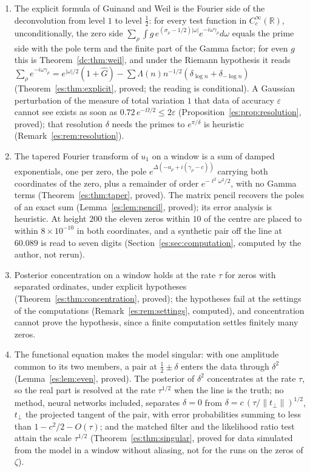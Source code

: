 \begin{enumerate}
\item The explicit formula of Guinand and Weil is the Fourier side of the deconvolution from level $1$ to level $\tfrac12$: for every test function in $C_c^\infty(\mathbb R)$, unconditionally, the zero side $\sum_\rho\int g\,e^{(\sigma_\rho-1/2)|\omega|}e^{-i\omega\gamma_\rho}d\omega$ equals the prime side with the pole term and the finite part of the Gamma factor; for even $g$ this is Theorem~\ref{dc:thm:weil}, and under the Riemann hypothesis it reads $\sum_\rho e^{-i\omega\gamma_\rho}=e^{|\omega|/2}(1+\widehat G)-\sum\Lambda(n)n^{-1/2}(\delta_{\log n}+\delta_{-\log n})$ (Theorem~\ref{es:thm:explicit}, proved; the reading is conditional). A Gaussian perturbation of the measure of total variation $1$ that data of accuracy $\varepsilon$ cannot see exists as soon as $0.72\,e^{-\Omega/2}\le2\varepsilon$ (Proposition~\ref{es:prop:resolution}, proved); that resolution $\delta$ needs the primes to $e^{\pi/\delta}$ is heuristic (Remark~\ref{es:rem:resolution}).
\item The tapered Fourier transform of $u_1$ on a window is a sum of damped exponentials, one per zero, the pole $e^{\Delta(-a_\rho+i(\gamma_\rho-c))}$ carrying both coordinates of the zero, plus a remainder of order $e^{-\ell^2\omega^2/2}$, with no Gamma terms (Theorem~\ref{es:thm:taper}, proved). The matrix pencil recovers the poles of an exact sum (Lemma~\ref{es:lem:pencil}, proved); its error analysis is heuristic. At height $200$ the eleven zeros within $10$ of the centre are placed to within $8\times10^{-10}$ in both coordinates, and a synthetic pair off the line at $60.089$ is read to seven digits (Section~\ref{es:sec:computation}, computed by the author, not rerun).
\item Posterior concentration on a window holds at the rate $\tau$ for zeros with separated ordinates, under explicit hypotheses (Theorem~\ref{es:thm:concentration}, proved); the hypotheses fail at the settings of the computations (Remark~\ref{es:rem:settings}, computed), and concentration cannot prove the hypothesis, since a finite computation settles finitely many zeros.
\item The functional equation makes the model singular: with one amplitude common to its two members, a pair at $\tfrac12\pm\delta$ enters the data through $\delta^2$ (Lemma~\ref{es:lem:even}, proved). The posterior of $\delta^2$ concentrates at the rate $\tau$, so the real part is resolved at the rate $\tau^{1/2}$ when the line is the truth; no method, neural networks included, separates $\delta=0$ from $\delta=c\,(\tau/\|t_\perp\|)^{1/2}$, $t_\perp$ the projected tangent of the pair, with error probabilities summing to less than $1-c^2/2-O(\tau)$; and the matched filter and the likelihood ratio test attain the scale $\tau^{1/2}$ (Theorem~\ref{es:thm:singular}, proved for data simulated from the model in a window without aliasing, not for the runs on the zeros of $\zeta$).

\end{enumerate}
